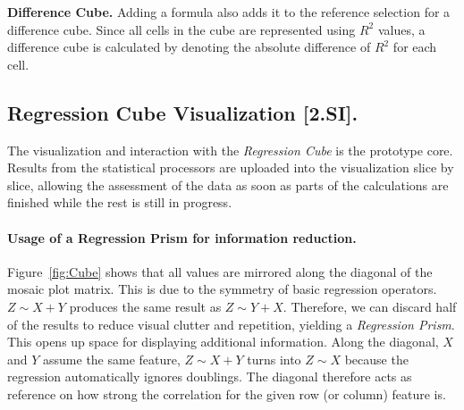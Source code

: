 \documentclass[journal]{style/vgtc} 			          %
\newcommand{\com}[1]{\textcolor{orange}{\uline{#1}}}
\begin{document}
\textbf{Difference Cube.}
Adding a formula also adds it to the reference selection for a difference cube.
Since all cells in the cube are represented using $R^2$ values, a difference cube is calculated by denoting the absolute difference of $R^2$ for each cell.


\subsection{Regression Cube Visualization [2.SI].}
The visualization and interaction with the \emph{Regression Cube} is the prototype core.
Results from the statistical processors are uploaded into the visualization slice by slice, allowing the assessment of the data as soon as parts of the calculations are finished while the rest is still in progress.

\paragraph{Usage of a Regression Prism for information reduction.}
Figure~\ref{fig:Cube} shows that all values are mirrored along the diagonal of the mosaic plot matrix.
This is due to the symmetry of basic regression operators.
$Z \sim X + Y$ produces the same result as $Z \sim Y + X$.
Therefore, we can discard half of the results to reduce visual clutter and repetition, yielding a \emph{Regression Prism}.
This opens up space for displaying additional information.
Along the diagonal, $X$ and $Y$ assume the same feature, $Z \sim X + Y$ turns into $Z \sim X$ because the regression automatically ignores doublings.
The diagonal therefore acts as reference on how strong the correlation for the given row (or column) feature is.
\end{document}

